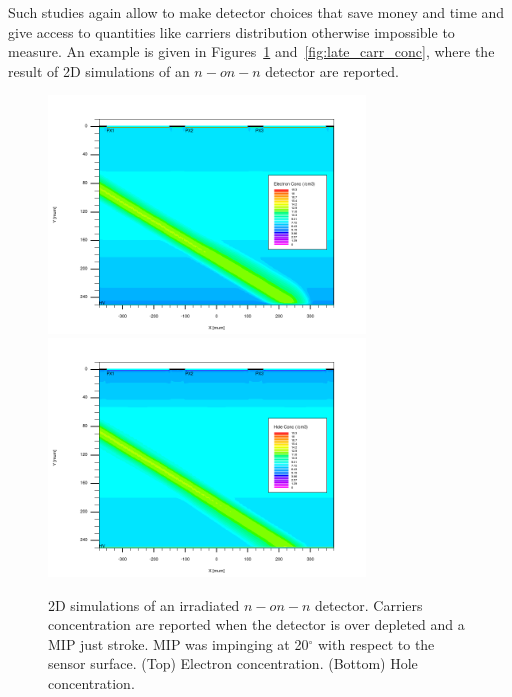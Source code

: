 Such studies again allow to make detector choices that save money and time and give access to 
quantities like carriers distribution otherwise impossible to measure. An example is given in 
Figures~\ref{fig:early_carr_conc} and~\ref{fig:late_carr_conc}, where the result of 2D simulations of an  $n-on-n$ detector 
are reported.
\begin{figure}[!htbp]
\centering
\includegraphics[width=0.75\textwidth]{econ_early.png}
\includegraphics[width=0.75\textwidth]{hcon_early.png}
\caption{\label{fig:early_carr_conc}2D simulations of an irradiated $n-on-n$ detector. Carriers concentration
are reported when the detector is over depleted and a MIP just stroke. 
MIP was impinging at 20$^{\circ}$ with respect to the sensor surface. (Top) Electron concentration. 
(Bottom) Hole concentration.}
\end{figure}
